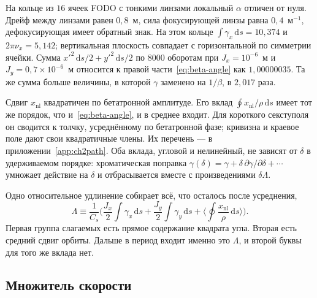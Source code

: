 \documentclass[aps,pra,preprint,a4paper,amsmath,amssymb,longbibliography]{revtex4-2}
\begin{document}
На кольце из $16$ ячеек FODO с тонкими линзами локальный $\alpha$ отличен от нуля. Дрейф между линзами равен $0{,}8$~м, сила фокусирующей линзы равна $0{,}4$~м$^{-1}$, дефокусирующая имеет обратный знак. На этом кольце $\int\gamma_x\,\mathrm{d}s=10{,}374$ и $2\pi\nu_x=5{,}142$; вертикальная плоскость совпадает с горизонтальной по симметрии ячейки. Сумма $x'^2\,\mathrm{d}s/2+y'^2\,\mathrm{d}s/2$ по $8000$ оборотам при $J_x=10^{-6}$~м и $J_y=0{,}7\times 10^{-6}$~м относится к правой части~\eqref{eq:beta-angle} как $1{,}00000035$. Та же сумма больше величины, в которой $\gamma$ заменено на $1/\beta$, в $2{,}017$ раза.

Сдвиг $x_{\mathrm{nl}}$ квадратичен по бетатронной амплитуде. Его вклад $\oint x_{\mathrm{nl}}/\rho\,\mathrm{d}s$ имеет тот же порядок, что и~\eqref{eq:beta-angle}, и в среднее входит. Для короткого секступоля он сводится к толчку, усреднённому по бетатронной фазе; кривизна и краевое поле дают свои квадратичные члены. Их перечень --- в приложении~\ref{app:ch2path}. Оба вклада, угловой и нелинейный, не зависят от $\delta$ в удерживаемом порядке: хроматическая поправка $\gamma(\delta)=\gamma+\delta\,\partial\gamma/\partial\delta+\cdots$ умножает действие на $\delta$ и отбрасывается вместе с произведениями $\delta\Lambda$.

Одно относительное удлинение собирает всё, что осталось после усреднения,
\begin{equation}
\label{eq:beta-Lambda}
\Lambda
\equiv
\frac{1}{C_s}
\Biggl(
\frac{J_x}{2}\int\gamma_x\,\mathrm{d}s
+\frac{J_y}{2}\int\gamma_y\,\mathrm{d}s
+\Biggl\langle\oint\frac{x_{\mathrm{nl}}}{\rho}\,\mathrm{d}s\Biggr\rangle
\Biggr).
\end{equation}
Первая группа слагаемых есть прямое содержание квадрата угла. Вторая есть средний сдвиг орбиты. Дальше в период входит именно это $\Lambda$, и второй буквы для того же вклада нет.

\subsection{Множитель скорости}
\label{sec:ch2-speed}
\end{document}
